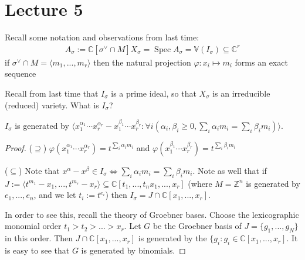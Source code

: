 \documentclass[a4paper,12pt]{amsart}
\newcommand{\ZZ}{\mathbb{Z}}
\newcommand{\CC}{\mathbb{C}}
\newcommand{\bb}[1]{{\mathbb{#1}}}
\DeclareMathOperator{\Spec}{Spec}
\begin{document}
\newpage
\section{Lecture 5}

Recall some notation and observations from last time:
\begin{align*}
A_\sigma := \CC[\sigma^\vee \cap M]
X_\sigma = \Spec A_\sigma = \bb{V}(I_\sigma) \subseteq \CC^r
\end{align*}
if $\sigma^\vee \cap M = \langle m_1, ..., m_r \rangle$ then the natural projection $\varphi: x_i \mapsto m_i$ forms an exact sequence
\begin{center}
\end{center}

Recall from last time that $I_\sigma$ is a prime ideal, so that $X_\sigma$ is an irreducible (reduced) variety. What is $I_\sigma$?

\begin{Proposition}
$I_\sigma$ is generated by $\langle x_1^{\alpha_1} \cdots x_r^{\alpha_r} - x_1^{\beta_1} \cdots x_r^{\beta_r} : \forall i (\alpha_i, \beta_i \geq 0, \sum_i \alpha_i m_i = \sum_i \beta_i m_i) \rangle $.
\end{Proposition}
\begin{proof}

($\supseteq$) $\varphi(x_1^{\alpha_1} \cdots x_r^{\alpha_r}) = t^{\sum_i \alpha_i m_i}$ and $\varphi(x_1^{\beta_1} \cdots x_r^{\beta_r}) = t^{\sum_i \beta_i m_i}$

($\subseteq$) Note that $x^\alpha - x^\beta \in I_\sigma \iff \sum_i \alpha_i m_i = \sum_i \beta_i m_i$. Note as well that if $J := \langle t^{m_1} - x_1, ..., t^{m_r} - x_r\rangle \subseteq \CC[t_1, ..., t_n x_1, ..., x_r]$ (where $M = \ZZ^n$ is generated by $e_1, ..., e_n$, and we let $t_i := t^{e_i}$) then $I_\sigma = J \cap \CC[x_1, ..., x_r]$.

In order to see this, recall the theory of Groebner bases. Choose the lexicographic monomial order $t_1 > t_2 > ... > x_r$. Let $G$ be the Groebner basis of $J = \{g_1, ..., g_N\}$ in this order. Then $J \cap \CC[x_1, ..., x_r]$ is generated by the $\{g_i : g_i \in \CC[x_1, ..., x_r]$. It is easy to see that $G$ is generated by binomials.
\end{proof}
\end{document}
